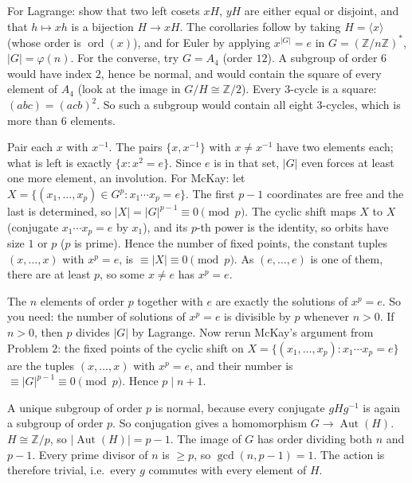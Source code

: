 \documentclass[11pt,a4paper]{article}
\begin{document}

 For Lagrange: show that two left cosets $xH$, $yH$ are either equal or disjoint, and that $h\mapsto xh$ is a bijection $H\to xH$. The corollaries follow by taking $H=\langle x\rangle$ (whose order is $\operatorname{ord}(x)$), and for Euler by applying $x^{|G|}=e$ in $G=(\mathbb Z/n\mathbb Z)^*$, $|G|=\varphi(n)$.
 For the converse, try $G=A_4$ (order $12$). A subgroup of order $6$ would have index $2$, hence be normal, and would contain the square of every element of $A_4$ (look at the image in $G/H\cong\mathbb Z/2$).
 Every $3$-cycle is a square: $(abc)=(acb)^2$. So such a subgroup would contain all eight $3$-cycles, which is more than $6$ elements.

 Pair each $x$ with $x^{-1}$. The pairs $\{x,x^{-1}\}$ with $x\ne x^{-1}$ have two elements each; what is left is exactly $\{x: x^2=e\}$. Since $e$ is in that set, $|G|$ even forces at least one more element, an involution.
 For McKay: let $X=\{(x_1,\dots,x_p)\in G^p : x_1\cdots x_p=e\}$. The first $p-1$ coordinates are free and the last is determined, so $|X|=|G|^{p-1}\equiv 0\pmod p$.
 The cyclic shift maps $X$ to $X$ (conjugate $x_1\cdots x_p=e$ by $x_1$), and its $p$-th power is the identity, so orbits have size $1$ or $p$ ($p$ is prime). Hence the number of fixed points, the constant tuples $(x,\dots,x)$ with $x^p=e$, is $\equiv |X|\equiv 0\pmod p$. As $(e,\dots,e)$ is one of them, there are at least $p$, so some $x\ne e$ has $x^p=e$.

 The $n$ elements of order $p$ together with $e$ are exactly the solutions of $x^p=e$. So you need: the number of solutions of $x^p=e$ is divisible by $p$ whenever $n>0$.
 If $n>0$, then $p$ divides $|G|$ by Lagrange. Now rerun McKay's argument from Problem 2: the fixed points of the cyclic shift on $X=\{(x_1,\dots,x_p):x_1\cdots x_p=e\}$ are the tuples $(x,\dots,x)$ with $x^p=e$, and their number is $\equiv|G|^{p-1}\equiv0\pmod p$. Hence $p\mid n+1$.

 A unique subgroup of order $p$ is normal, because every conjugate $gHg^{-1}$ is again a subgroup of order $p$. So conjugation gives a homomorphism $G\to\operatorname{Aut}(H)$.
 $H\cong\mathbb Z/p$, so $|\operatorname{Aut}(H)|=p-1$. The image of $G$ has order dividing both $n$ and $p-1$.
 Every prime divisor of $n$ is $\ge p$, so $\gcd(n,p-1)=1$. The action is therefore trivial, i.e.\ every $g$ commutes with every element of $H$.
\end{document}
